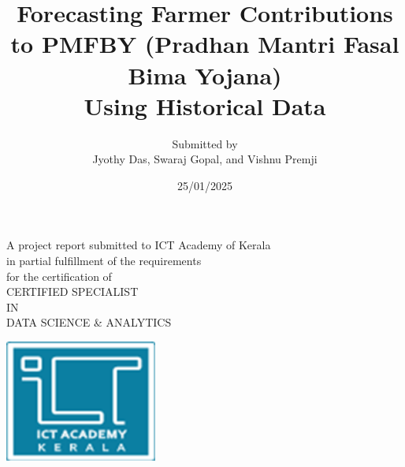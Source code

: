 \documentclass[12pt]{article}
\begin{document}
\title{Forecasting Farmer Contributions to PMFBY (Pradhan Mantri Fasal Bima Yojana) \\ Using Historical Data}

\author{Submitted by\\ Jyothy Das, Swaraj Gopal, and Vishnu Premji}
\date{25/01/2025}
\maketitle

\vspace{30pt}
\begin{center}
A project report submitted to ICT Academy of Kerala\\
in partial fulfillment of the requirements\\
for the certification of\\
\vspace{45pt}
{\LARGE CERTIFIED SPECIALIST}\\
\vspace{10pt}
{\LARGE IN}\\
\vspace{10pt}
{\LARGE DATA SCIENCE \& ANALYTICS}
\end{center}

\vspace{20pt}

\begin{center}
\includegraphics[width=5cm]{logo.png} %
\end{center}

\tableofcontents
\listoffigures
\listoftables

\newpage
\end{document}
